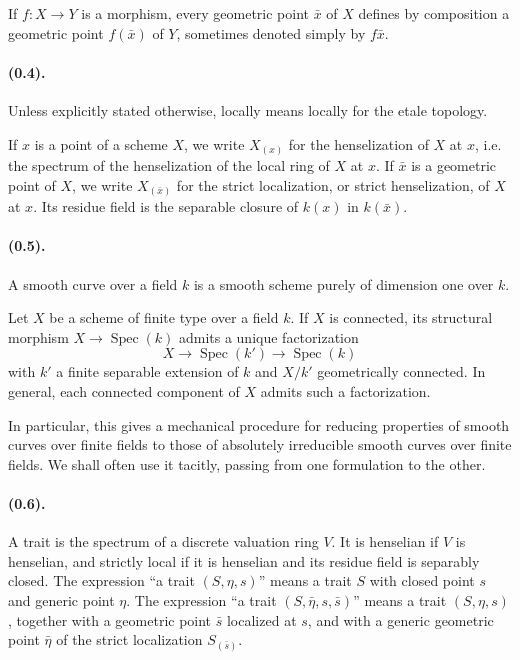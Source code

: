 \documentclass[11pt]{article}
\theoremstyle{remark}
\newcommand{\Spec}{\operatorname{Spec}}
\begin{document}
If $f:X\to Y$ is a morphism, every geometric point $\bar x$ of $X$ defines by composition a geometric point $f(\bar x)$ of $Y$, sometimes denoted simply by $f\bar x$.

\paragraph{(0.4).} Unless explicitly stated otherwise, locally means locally for the etale topology.

If $x$ is a point of a scheme $X$, we write $X_{(x)}$ for the henselization of $X$ at $x$, i.e. the spectrum of the henselization of the local ring of $X$ at $x$. If $\bar x$ is a geometric point of $X$, we write $X_{(\bar x)}$ for the strict localization, or strict henselization, of $X$ at $x$. Its residue field is the separable closure of $k(x)$ in $k(\bar x)$.

\paragraph{(0.5).} A smooth curve over a field $k$ is a smooth scheme purely of dimension one over $k$.

Let $X$ be a scheme of finite type over a field $k$. If $X$ is connected, its structural morphism $X\to\Spec(k)$ admits a unique factorization
\[
X\longrightarrow \Spec(k')\longrightarrow \Spec(k)
\]
with $k'$ a finite separable extension of $k$ and $X/k'$ geometrically connected. In general, each connected component of $X$ admits such a factorization.

In particular, this gives a mechanical procedure for reducing properties of smooth curves over finite fields to those of absolutely irreducible smooth curves over finite fields. We shall often use it tacitly, passing from one formulation to the other.

\paragraph{(0.6).} A trait is the spectrum of a discrete valuation ring $V$. It is henselian if $V$ is henselian, and strictly local if it is henselian and its residue field is separably closed. The expression ``a trait $(S,\eta,s)$'' means a trait $S$ with closed point $s$ and generic point $\eta$. The expression ``a trait $(S,\bar\eta,s,\bar s)$'' means a trait $(S,\eta,s)$, together with a geometric point $\bar s$ localized at $s$, and with a generic geometric point $\bar\eta$ of the strict localization $S_{(\bar s)}$.
\end{document}
